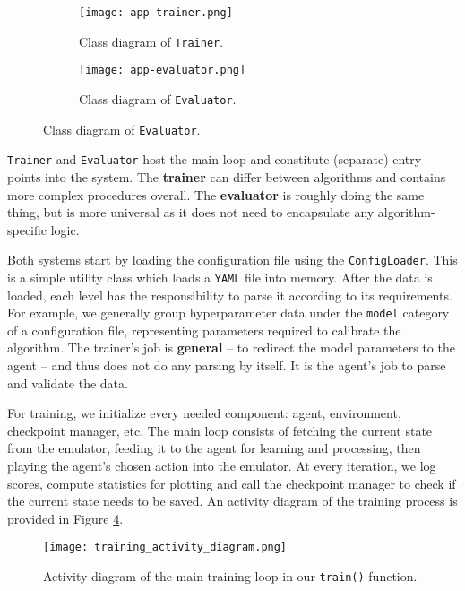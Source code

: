 \begin{figure}[ht]
    \centering
    \begin{subfigure}[b]{0.5\textwidth}
        \centering
        \texttt{[image: app-trainer.png]}
        \caption{Class diagram of \texttt{Trainer}.}
        \label{fig:trainer-diagram}
    \end{subfigure}%
    \hfill
    \begin{subfigure}[b]{0.5\textwidth}
        \centering
        \texttt{[image: app-evaluator.png]}
        \caption{Class diagram of \texttt{Evaluator}.}
        \label{fig:evaluator-diagram}
    \end{subfigure}
\end{figure}

\texttt{Trainer} and \texttt{Evaluator} host the main loop and constitute (separate) entry points into the system.
The \textbf{trainer} can differ between algorithms and contains more complex procedures overall.
The \textbf{evaluator} is roughly doing the same thing, but is more universal as it does not need to encapsulate any algorithm-specific logic.

Both systems start by loading the configuration file using the \texttt{ConfigLoader}.
This is a simple utility class which loads a \texttt{YAML} file into memory.
After the data is loaded, each level has the responsibility to parse it according to its requirements.
For example, we generally group hyperparameter data under the \texttt{model} category of a configuration file, representing parameters required to calibrate the algorithm.
The trainer's job is \textbf{general} -- to redirect the model parameters to the agent -- and thus does not do any parsing by itself.
It is the agent’s job to parse and validate the data.

For training, we initialize every needed component: agent, environment, checkpoint manager, etc.
The main loop consists of fetching the current state from the emulator, feeding it to the agent for learning and processing, then playing the agent’s chosen action into the emulator.
At every iteration, we log scores, compute statistics for plotting and call the checkpoint manager to check if the current state needs to be saved.
An activity diagram of the training process is provided in Figure \ref{fig:training-loop-activity-diagram}.

\begin{figure}[h]
    \centering
    \texttt{[image: training\_activity\_diagram.png]}
    \caption{Activity diagram of the main training loop in our \texttt{train()} function.}
    \label{fig:training-loop-activity-diagram}
\end{figure}

